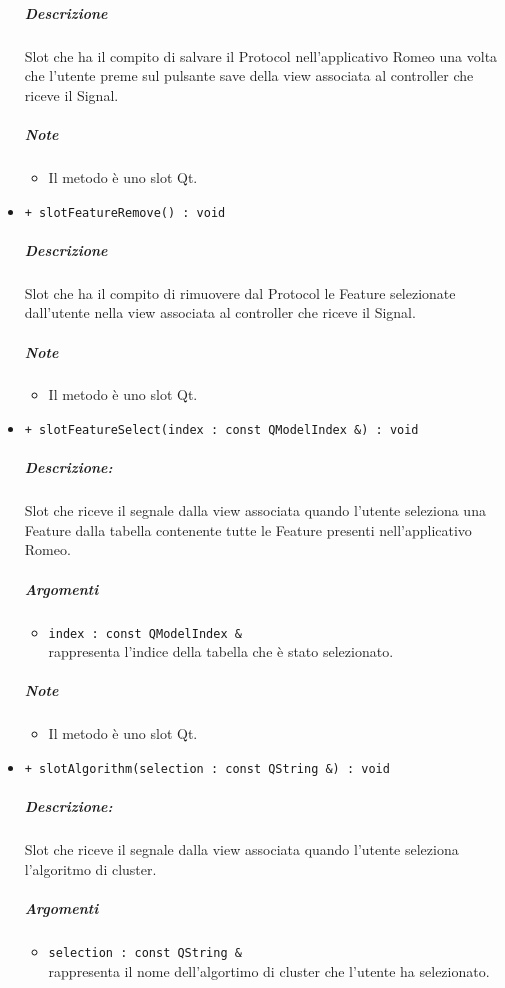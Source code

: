 \begin{itemize}
			\color{black}
			\subparagraph{Descrizione} Slot\g{} che ha il compito di salvare il Protocol\g{} nell'applicativo Romeo una volta che l'utente preme sul pulsante save della view associata al controller che riceve il Signal\g{}.
			\subparagraph{Note}
			\begin{itemize}
				\item Il metodo è uno slot\g{} Qt\g{}.
			\end{itemize}
			\item \color{blue} \verb!+ slotFeatureRemove() : void!
			\color{black}
			\subparagraph{Descrizione} Slot\g{} che ha il compito di rimuovere dal Protocol\g{} le Feature\g{} selezionate dall'utente nella view associata al controller che riceve il Signal\g{}.
			\subparagraph{Note}
			\begin{itemize}
				\item Il metodo è uno slot\g{} Qt\g{}.
			\end{itemize}
			\item \color{blue} \verb!+ slotFeatureSelect(index : const QModelIndex &) : void!
			\color{black}
			\subparagraph{Descrizione:} Slot\g{} che riceve il segnale dalla view associata quando l'utente seleziona una Feature\g{} dalla tabella contenente tutte le Feature\g{} presenti nell'applicativo Romeo.
			\color{black}
			\subparagraph{Argomenti}
			\begin{itemize}
				\item \color{RoyalPurple} \verb!index : const QModelIndex &!\\				
\color{black} rappresenta l'indice della tabella che è stato selezionato.
			\end{itemize}
			\subparagraph{Note}
			\begin{itemize}
				\item Il metodo è uno slot\g{} Qt\g{}.
			\end{itemize}
			\item \color{blue} \verb!+ slotAlgorithm(selection : const QString &) : void!
			\color{black}
			\subparagraph{Descrizione:} Slot\g{} che riceve il segnale dalla view associata quando l'utente seleziona l'algoritmo di cluster\g{}.
			\color{black}
			\subparagraph{Argomenti}
			\begin{itemize}
				\item \color{RoyalPurple} \verb!selection : const QString &!\\				
\color{black} rappresenta il nome dell'algortimo di cluster\g{} che l'utente ha selezionato.
			\end{itemize}

\end{itemize}
